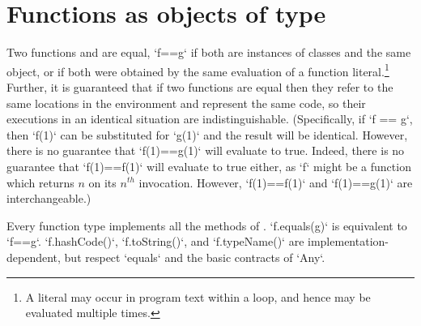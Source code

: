 \section{Functions as objects of type }
\label{FunctionAnyMethods}

\label{FunctionEquality}
  Two functions  and
 are equal, \xcd`f==g` if both are instances of classes and the same
object, or if both were obtained by the same evaluation of a function
literal.\footnote{A literal may occur in program text within a loop, and hence
  may be evaluated multiple times.} Further, it is guaranteed that if two
functions are equal then they refer to the same locations in the environment
and represent the same code, so their executions in an identical situation are
indistinguishable. (Specifically, if \xcd`f == g`, then \xcd`f(1)` can be
substituted for \xcd`g(1)` and the result will be identical. However, there is
no guarantee that \xcd`f(1)==g(1)` will evaluate to true. Indeed, there is no
guarantee that \xcd`f(1)==f(1)` will evaluate to true either, as \xcd`f` might
be a function which returns {$n$} on its {$n^{th}$} invocation. However,
\xcd`f(1)==f(1)` and \xcd`f(1)==g(1)` are interchangeable.)


Every function type implements all the methods of .
\xcd`f.equals(g)` is equivalent to \xcd`f==g`.  \xcd`f.hashCode()`, 
\xcd`f.toString()`, and \xcd`f.typeName()` are implementation-dependent, but
respect \xcd`equals` and the basic contracts of \xcd`Any`. 




